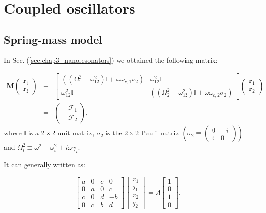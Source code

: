 \chapter{Coupled oscillators}

\section{Spring-mass model \label{app:coupled_masses}}

In Sec. (\ref{sec:chap3_nanoresonators}) we obtained the following matrix:

\begin{eqnarray}
\mathbf{M}\left(\begin{array}{c}
\mathbf{r}_{1}\\
\mathbf{r}_{2}
\end{array}\right) & \equiv & \left[\begin{array}{cc}
\left(\left(\Omega_{1}^{2}-\omega_{12}^{2}\right)\mathbb{\mathbb{I}}+\omega\omega_{c,1}\sigma_{2}\right) & \omega_{12}^{2}\mathbb{I}\\
\omega_{12}^{2}\mathbb{I} & \left(\left(\Omega_{2}^{2}-\omega_{12}^{2}\right)\mathbb{\mathbb{I}}+\omega\omega_{c,2}\sigma_{2}\right)
\end{array}\right]\left(\begin{array}{c}
\mathbf{r}_{1}\\
\mathbf{r}_{2}
\end{array}\right)\nonumber \\
 & = & \left(\begin{array}{c}
-\mathcal{F}_{1}\\
-\mathcal{F}_{2}
\end{array}\right),
\end{eqnarray}
where $\mathbb{I}$ is a $2\times2$ unit matrix, $\sigma_{2}$ is the $2\times2$ Pauli matrix $\left(\sigma_{2}\equiv \left(\begin{array}{cc}
0 & -i\\
i & 0
\end{array}\right)\right)$ and $\Omega_{i}^2\equiv \omega^2 -\omega_{i}^2 + i\omega \gamma_{i}$.

It can generally written as: 

\begin{equation}
\left[\begin{array}{cccc}
a & 0 & c & 0\\
0 & a & 0 & c\\
c & 0 & d & -b\\
0 & c & b & d
\end{array}\right]\left[\begin{array}{c}
x_{1}\\
y_{1}\\
x_{2}\\
y_{2}
\end{array}\right]=A\left[\begin{array}{c}
1\\
0\\
1\\
0
\end{array}\right].
\end{equation}

